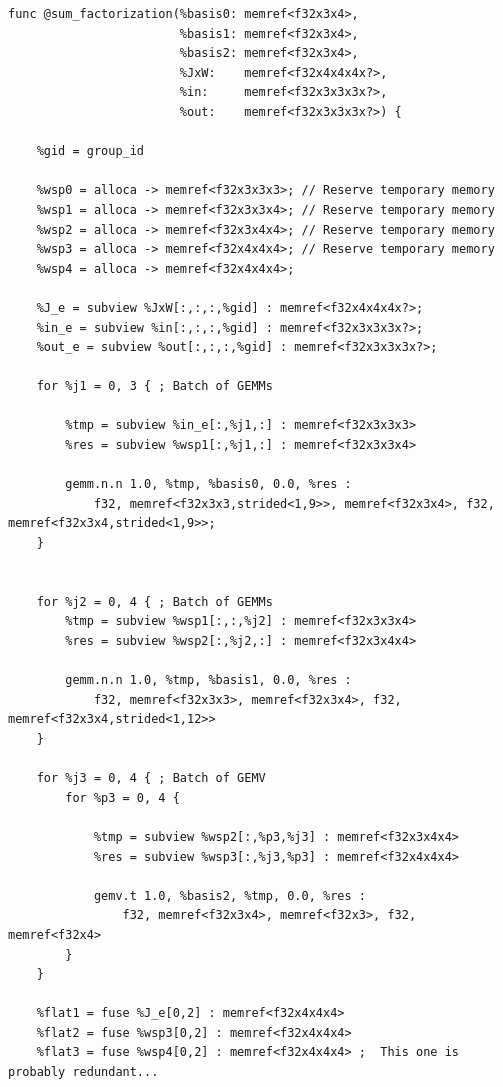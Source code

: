 \documentclass[a4paper,12pt]{article}
\begin{document}
\begin{lstlisting}[language=TensorIR,caption={BK1 using Tensor IR},basicstyle=\ttfamily\tiny]
func @sum_factorization(%basis0: memref<f32x3x4>,
                        %basis1: memref<f32x3x4>,
                        %basis2: memref<f32x3x4>,
                        %JxW:    memref<f32x4x4x4x?>,
                        %in:     memref<f32x3x3x3x?>,
                        %out:    memref<f32x3x3x3x?>) {

    %gid = group_id

    %wsp0 = alloca -> memref<f32x3x3x3>; // Reserve temporary memory
    %wsp1 = alloca -> memref<f32x3x3x4>; // Reserve temporary memory
    %wsp2 = alloca -> memref<f32x3x4x4>; // Reserve temporary memory
    %wsp3 = alloca -> memref<f32x4x4x4>; // Reserve temporary memory
    %wsp4 = alloca -> memref<f32x4x4x4>;

    %J_e = subview %JxW[:,:,:,%gid] : memref<f32x4x4x4x?>;
    %in_e = subview %in[:,:,:,%gid] : memref<f32x3x3x3x?>;
    %out_e = subview %out[:,:,:,%gid] : memref<f32x3x3x3x?>;

    for %j1 = 0, 3 { ; Batch of GEMMs

        %tmp = subview %in_e[:,%j1,:] : memref<f32x3x3x3>
        %res = subview %wsp1[:,%j1,:] : memref<f32x3x3x4>

        gemm.n.n 1.0, %tmp, %basis0, 0.0, %res :
            f32, memref<f32x3x3,strided<1,9>>, memref<f32x3x4>, f32, memref<f32x3x4,strided<1,9>>;
    }

    
    for %j2 = 0, 4 { ; Batch of GEMMs
        %tmp = subview %wsp1[:,:,%j2] : memref<f32x3x3x4>
        %res = subview %wsp2[:,%j2,:] : memref<f32x3x4x4>

        gemm.n.n 1.0, %tmp, %basis1, 0.0, %res :
            f32, memref<f32x3x3>, memref<f32x3x4>, f32, memref<f32x3x4,strided<1,12>>
    }

    for %j3 = 0, 4 { ; Batch of GEMV
        for %p3 = 0, 4 {
        
            %tmp = subview %wsp2[:,%p3,%j3] : memref<f32x3x4x4>
            %res = subview %wsp3[:,%j3,%p3] : memref<f32x4x4x4>

            gemv.t 1.0, %basis2, %tmp, 0.0, %res :
                f32, memref<f32x3x4>, memref<f32x3>, f32, memref<f32x4> 
        }
    }    

    %flat1 = fuse %J_e[0,2] : memref<f32x4x4x4>
    %flat2 = fuse %wsp3[0,2] : memref<f32x4x4x4>
    %flat3 = fuse %wsp4[0,2] : memref<f32x4x4x4> ;  This one is probably redundant...


\end{lstlisting}
\end{document}
